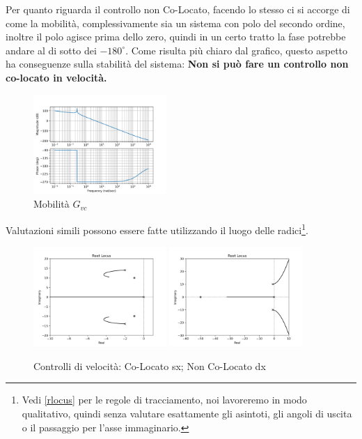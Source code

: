 Per quanto riguarda il controllo non Co-Locato, facendo lo stesso ci si accorge di come la mobilità, complessivamente sia un sistema con polo del secondo ordine, inoltre il polo agisce prima dello zero, quindi in un certo tratto la fase potrebbe andare al di sotto dei \(-180^\circ\). Come risulta più chiaro dal grafico, questo aspetto ha conseguenze sulla stabilità del sistema: \textbf{Non si può fare un controllo non co-locato in velocità.}

\begin{figure}[h]
    \centering
    \includegraphics[width=0.45\textwidth]{Immagini/mobilita_gvc.png}
    \caption{Mobilità \(G_{vc}\)}
\end{figure}

Valutazioni simili possono essere fatte utilizzando il luogo delle radici\footnote{Vedi \ref{rlocus} per le regole di tracciamento, noi lavoreremo in modo qualitativo, quindi senza valutare esattamente gli asintoti, gli angoli di uscita o il passaggio per l'asse immaginario.}.

\begin{figure}[h]
    \centering
    \includegraphics[width=0.45\textwidth]{Immagini/controllo_v_colocato.png}
    \includegraphics[width=0.45\textwidth]{Immagini/controllo_v_non_colocato.png}
    \caption{Controlli di velocità: Co-Locato sx; Non Co-Locato dx}
\end{figure}

